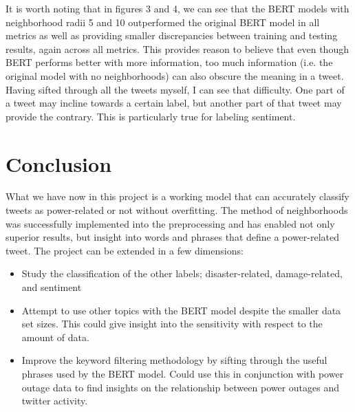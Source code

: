 \documentclass[12pt, a4paper]{article}
\begin{document}
It is worth noting that in figures 3 and 4, we can see that the BERT models with neighborhood radii 5 and 10 outperformed the original BERT model in all metrics as well as providing smaller discrepancies between training and testing results, again across all metrics. This provides reason to believe that even though BERT performs better with more information, too much information (i.e. the original model with no neighborhoods) can also obscure the meaning in a tweet. Having sifted through all the tweets myself, I can see that difficulty. One part of a tweet may incline towards a certain label, but another part of that tweet may provide the contrary. This is particularly true for labeling sentiment.
    
\section{Conclusion}
What we have now in this project is a working model that can accurately classify tweets as power-related or not without overfitting. The method of neighborhoods was successfully implemented into the preprocessing and has enabled not only superior results, but insight into words and phrases that define a power-related tweet. The project can be extended in a few dimensions:
\begin{itemize}
    \item Study the classification of the other labels; disaster-related, damage-related, and sentiment
    \item Attempt to use other topics with the BERT model despite the smaller data set sizes. This could give insight into the sensitivity with respect to the amount of data.
    \item Improve the keyword filtering methodology by sifting through the useful phrases used by the BERT model. Could use this in conjunction with power outage data to find insights on the relationship between power outages and twitter activity.
\end{itemize}

    
\end{document}
